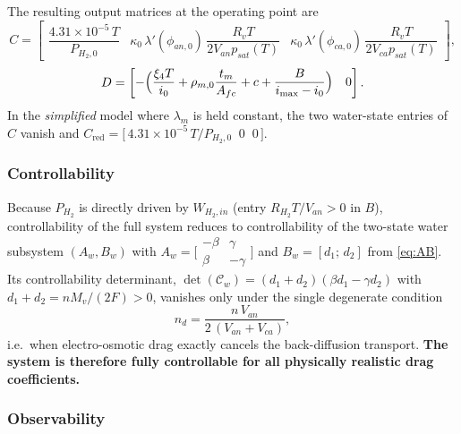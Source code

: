 \documentclass[11pt,a4paper]{article}
\begin{document}
The resulting output matrices at the operating point are
\begin{equation}
    C =
    \begin{bmatrix}
        \dfrac{4.31\times10^{-5}\,T}{P_{H_2,0}} &
        \kappa_0\,\lambda'(\phi_{an,0})\,\dfrac{R_v T}{2V_{an}p_{sat}(T)} &
        \kappa_0\,\lambda'(\phi_{ca,0})\,\dfrac{R_v T}{2V_{ca}p_{sat}(T)}
    \end{bmatrix},
    \label{eq:Cmat}
\end{equation}
\begin{equation}
    D =
    \begin{bmatrix}
        -\Bigl(\dfrac{\xi_4 T}{i_0}
        + \rho_{m,0}\dfrac{t_m}{A_{fc}} + c
        + \dfrac{B}{i_{\max}-i_0}\Bigr) & 0
    \end{bmatrix}.
    \label{eq:Dmat}
\end{equation}
In the \emph{simplified} model where $\lambda_m$ is held constant, the two
water-state entries of $C$ vanish and
$C_{\text{red}} = \bigl[\,4.31\times10^{-5}\,T/P_{H_2,0}\;\;0\;\;0\,\bigr]$.

\subsubsection{Controllability}

Because $P_{H_2}$ is directly driven by $W_{H_2,in}$ (entry
$R_{H_2}T/V_{an}>0$ in $B$), controllability of the full system reduces to
controllability of the two-state water subsystem
$(A_w,B_w)$ with
$A_w=\bigl[\begin{smallmatrix}-\beta & \gamma\\ \beta & -\gamma\end{smallmatrix}\bigr]$
and $B_w=[d_1;\,d_2]$ from \eqref{eq:AB}. Its controllability determinant,
$\det(\mathcal{C}_w)=(d_1+d_2)(\beta d_1-\gamma d_2)$ with
$d_1+d_2=nM_v/(2F)>0$, vanishes only under the single degenerate condition
\begin{equation}
    n_d = \frac{n\,V_{an}}{2\,(V_{an}+V_{ca})},
    \label{eq:ctrb-cond}
\end{equation}
i.e.\ when electro-osmotic drag exactly cancels the back-diffusion transport.
\textbf{The system is therefore fully controllable for all physically realistic
drag coefficients.}

\subsubsection{Observability}
\end{document}
